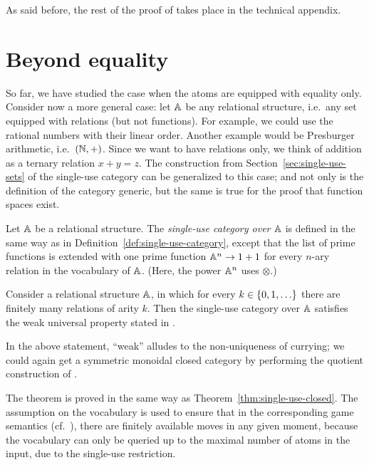 \documentclass[a4paper,UKenglish,cleveref, autoref, numberwithinsect, thm-restate]{lipics-v2021}
\begin{document}
As said before, the rest of the proof of  takes place in the technical appendix.

\section{Beyond equality}
\label{sec:beyond-equality}

So far, we have studied the case when the atoms are equipped with equality only. Consider now a more general case: let $\mathbb A$ be any relational structure, i.e.~any set equipped with relations (but not functions). For example, we could use the rational numbers with their linear order. Another example would be Presburger arithmetic, i.e.~$({\mathbb N},+)$. Since we want to have relations only, we think of addition as a ternary relation $x + y =z$. The construction from Section~\ref{sec:single-use-sets} of the single-use category can be generalized to this case; and not only is the definition of the category generic, but the same is true for  the proof that function spaces exist.

\begin{definition}\label{def:single-use-category-relational-structures}
    Let $\mathbb A$ be a relational structure. The \emph{single-use category over $\mathbb A$} is defined in the same way as in Definition~\ref{def:single-use-category}, except that the list of prime functions is extended with one prime function  $\mathbb A^n \to 1 + 1$ 
        for every $n$-ary relation in the vocabulary of $\mathbb A$. (Here, the power $\mathbb A^n$ uses $\otimes$.)
\end{definition}
\begin{theorem}\label{thm:single-use-closed-relational-structures}
    Consider a relational structure $\mathbb A$, in which for every $k \in \{0,1,\ldots\}$ there are finitely many relations of arity $k$. Then the single-use category over $\mathbb A$ satisfies the weak universal property stated in .
\end{theorem}
In the above statement, ``weak'' alludes to the non-uniqueness of currying; we could again get a symmetric monoidal closed category by performing the quotient construction of .

The theorem is proved in the same way as Theorem~\ref{thm:single-use-closed}.  The assumption on the vocabulary is used to ensure that in the corresponding game semantics (cf.~), there are finitely available moves in any given moment, because the vocabulary can only be queried up to the maximal number of atoms in the input, due to the single-use restriction.
\end{document}
